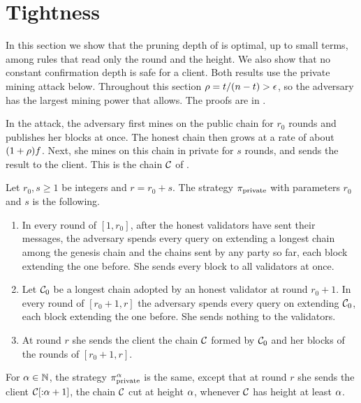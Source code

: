 \section{Tightness}
\label{sec.tightness}

In this section we show that the pruning depth of  is
optimal, up to small terms, among rules that read only the round and the height. We
also show that no constant confirmation depth is safe for a client. Both
results use the private mining attack below. Throughout this section
$\rho=t/(n-t)>\epsilon$, so the adversary has the largest mining power that
 allows. The proofs are in .

In the attack, the adversary first mines on the public chain for $r_0$ rounds
and publishes her blocks at once. The honest chain then grows at a rate of
about $(1+\rho)f$. Next, she mines on this chain in private for $s$ rounds,
and sends the result to the client. This is the chain $\mathcal{C}$ of .

\begin{definition}\label{def.private}
    Let $r_0,s\ge1$ be integers and $r=r_0+s$. The strategy $\pi_{\mathrm{private}}$ with parameters
    $r_0$ and $s$ is the following.
    \begin{enumerate}
        \item In every round of $[1,r_0]$, after the honest validators have
            sent their messages, the adversary spends every query on extending
            a longest chain among the genesis chain and the chains sent by any
            party so far, each block extending the one before. She sends every
            block to all validators at once.
        \item Let $\mathcal{C}_0$ be a longest chain adopted by an honest validator at
            round $r_0+1$. In every round of $[r_0+1,r]$ the adversary spends
            every query on extending $\mathcal{C}_0$, each block extending the one
            before. She sends nothing to the validators.
        \item At round $r$ she sends the client the chain $\mathcal{C}$ formed by
            $\mathcal{C}_0$ and her blocks of the rounds of $[r_0+1,r]$.
    \end{enumerate}
    For $\alpha\in\mathbb{N}$, the strategy $\pi_{\mathrm{private}}^\alpha$ is the same, except that at
    round $r$ she sends the client $\mathcal{C}[{:}\alpha+1]$, the chain $\mathcal{C}$ cut at
    height $\alpha$, whenever $\mathcal{C}$ has height at least $\alpha$.
\end{definition}

